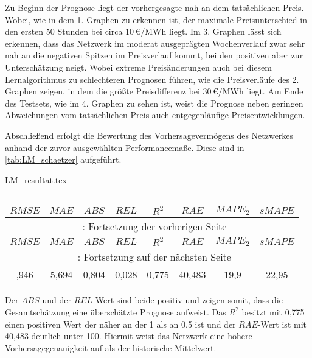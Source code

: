 Zu Beginn der Prognose liegt der vorhergesagte nah an dem tatsächlichen Preis. Wobei, wie in dem 1. Graphen zu erkennen ist, der maximale Preisunterschied in den ersten 50 Stunden bei circa 10\,€/MWh liegt. Im 3. Graphen lässt sich erkennen, dass das Netzwerk im moderat ausgeprägten Wochenverlauf zwar sehr nah an die negativen Spitzen im Preisverlauf kommt, bei den positiven aber zur Unterschätzung neigt. Wobei extreme Preisänderungen auch bei diesem Lernalgorithmus zu schlechteren Prognosen führen, wie die Preisverläufe des 2. Graphen zeigen, in dem die größte Preisdifferenz bei 30\,€/MWh liegt. Am Ende des Testsets, wie im 4. Graphen zu sehen ist, weist die Prognose neben geringen Abweichungen vom tatsächlichen Preis auch entgegenläufige Preisentwicklungen. 

Abschließend erfolgt die Bewertung des Vorhersagevermögens des Netzwerkes anhand der zuvor ausgewählten Performancemaße. Diese sind in \autoref{tab:LM_schaetzer} aufgeführt.

\begin{filecontents*}{LM_resultat.tex}
{
\captionsetup{skip=1pt,margin=5pt,position=below} %

\begin{longtable}{cccccccc}
    \caption{} \label{tab:LM_schaetzer}\\
    \toprule
    \hiderowcolors
        $RMSE$ & $MAE$ & $ABS$ & $REL$ & $R^2$ & $RAE$ & $MAPE_2$ & $sMAPE$ \\
    \midrule
    \endfirsthead
        \multicolumn{8}{c}{\footnotesize \tablename\ \thetable{}: Fortsetzung der vorherigen Seite} \\
    \toprule
        $RMSE$ & $MAE$ & $ABS$ & $REL$ & $R^2$ & $RAE$ & $MAPE_2$ & $sMAPE$ \\
    \midrule
    \endhead
    \midrule
        \multicolumn{8}{c}{{\footnotesize \tablename\ \thetable{}: Fortsetzung auf der nächsten Seite}} \\
    \bottomrule
    \endfoot
    \bottomrule
    \endlastfoot
    \showrowcolors
        7,946 & 5,694 & 0,804 & 0,028 & 0,775 & 40,483 & 19,9 & 22,95 \\
\end{longtable}

}
\end{filecontents*}

Der $ABS$ und der $REL$-Wert sind beide positiv und zeigen somit, dass die Gesamtschätzung eine überschätzte Prognose aufweist. Das $R^2$ besitzt mit 0,775 einen positiven Wert der näher an der 1 als an 0,5 ist und der $RAE$-Wert ist mit 40,483 deutlich unter 100. Hiermit weist das Netzwerk eine höhere Vorhersagegenauigkeit auf als der historische Mittelwert. 

